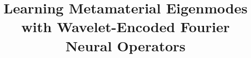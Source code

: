 \documentclass[preprint,review,12pt,numafflabel]{elsarticle}
\begin{document}
\linenumbers
\onehalfspacing

\begin{frontmatter}





\title{Learning Metamaterial Eigenmodes with Wavelet-Encoded Fourier Neural Operators}



\end{frontmatter}
\end{document}

